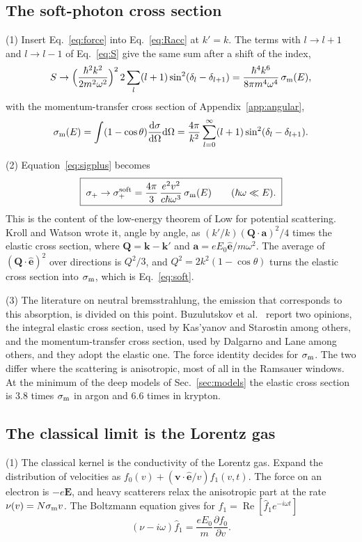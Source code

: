 \documentclass[11pt]{article}
\numberwithin{equation}{section}
\newcommand{\ehat}{\hat{\mathbf e}}
\newcommand{\kv}{\mathbf k}
\newcommand{\vv}{\mathbf v}
\newcommand{\Ev}{\mathbf E}
\newcommand{\Qv}{\mathbf Q}
\newcommand{\av}{\mathbf a}
\newcommand{\dd}{\mathrm d}
\newcommand{\sm}{\sigma_{\rm m}}
\DeclareMathOperator{\Real}{Re}
\begin{document}
\subsection{The soft-photon cross section}
{\noindent}(1) Insert Eq.~\eqref{eq:force} into Eq.~\eqref{eq:Racc} at
$k'=k$. The terms with $l\to l+1$ and $l\to l-1$ of Eq.~\eqref{eq:S} give the
same sum after a shift of the index,
\begin{equation}
S\to\Big(\frac{\hbar^2k^2}{2m^2\omega^2}\Big)^2\,2\sum_l(l+1)\sin^2(\delta_l-\delta_{l+1})
=\frac{\hbar^4k^6}{8\pi m^4\omega^4}\,\sm(E),
\end{equation}
with the momentum-transfer cross section of Appendix~\ref{app:angular},
\begin{equation}
\sm(E)=\int(1-\cos\theta)\frac{\dd\sigma}{\dd\Omega}\dd\Omega
=\frac{4\pi}{k^2}\sum_{l=0}^\infty(l+1)\sin^2(\delta_l-\delta_{l+1}).
\label{eq:sigmam}
\end{equation}

{\noindent}(2) Equation~\eqref{eq:sigplus} becomes
\begin{equation}
\boxed{\;\sigma_+\to\sigma_+^{\rm soft}=\frac{4\pi}{3}\,\frac{e^2v^2}{c\hbar\omega^3}\,\sm(E)
\qquad(\hbar\omega\ll E).\;}
\label{eq:soft}
\end{equation}
This is the content of the low-energy theorem of Low \cite{Low1958} for
potential scattering. Kroll and Watson \cite{KrollWatson1973} wrote it, angle by
angle, as $(k'/k)(\Qv\cdot\av)^2/4$ times the elastic cross section, where
$\Qv=\kv-\kv'$ and $\av=eE_0\ehat/m\omega^2$. The average of
$(\Qv\cdot\ehat)^2$ over directions is $Q^2/3$, and $Q^2=2k^2(1-\cos\theta)$
turns the elastic cross section into $\sm$, which is Eq.~\eqref{eq:soft}.

{\noindent}(3) The literature on neutral bremsstrahlung, the emission that
corresponds to this absorption, is divided on this point. Buzulutskov et
al.~\cite{Buzulutskov2018} report two opinions, the integral elastic cross
section, used by Kas'yanov and Starostin \cite{KasyanovStarostin1965} among
others, and the momentum-transfer cross section, used by Dalgarno and Lane
\cite{DalgarnoLane1966} among others, and they adopt the elastic one. The
force identity decides for $\sm$. The two differ where the scattering is
anisotropic, most of all in the Ramsauer windows. At the minimum of the deep
models of Sec.~\ref{sec:models} the elastic cross section is 3.8 times $\sm$
in argon and 6.6 times in krypton.

\subsection{The classical limit is the Lorentz gas}
\label{sec:classical}
{\noindent}(1) The classical kernel is the conductivity of the Lorentz gas. Expand the distribution of velocities as
$f_0(v)+(\vv\cdot\ehat/v)f_1(v,t)$. The force on an electron is $-e\Ev$, and
heavy scatterers relax the anisotropic part at the rate $\nu(v)=N\sm v$. The
Boltzmann equation gives for $f_1=\Real[\hat f_1e^{-i\omega t}]$
\begin{equation}
(\nu-i\omega)\hat f_1=\frac{eE_0}{m}\frac{\partial f_0}{\partial v}.
\end{equation}
\end{document}
